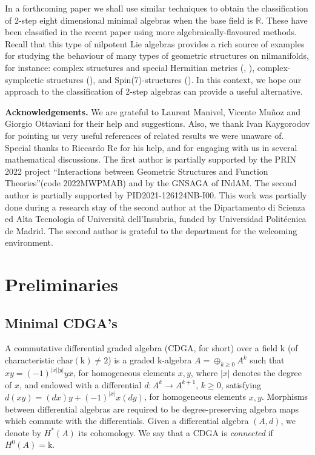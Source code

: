 \documentclass[10pt,reqno]{amsart}
\newcommand{\RR}{\mathbb{R}}
\newcommand{\kk}{\mathrm{k}}
\theoremstyle{definition}
\begin{document}
In a forthcoming paper we shall use similar techniques to obtain the classification of $2$-step eight dimensional minimal algebras when the base field is $\RR$. These have been classified in the recent paper \cite{Borovoi2024} using more algebraically-flavoured methods. Recall that this type of nilpotent Lie algebras provides a rich source of examples for studying the behaviour of many types of geometric structures on nilmanifolds, for instance: complex structures and special Hermitian metrics (\cite{latorre2025}, \cite{latorre2017}), complex-symplectic structures (\cite{bazzoni2018}), and Spin(7)-structures (\cite{bazzoni2022}).
In this context, we hope our approach to the classification of 2-step algebras can provide a useful alternative.




\textbf{Acknowledgements.} We are grateful to Laurent Manivel, Vicente Muñoz and Giorgio Ottaviani for their help and suggestions. Also, we thank Ivan Kaygorodov for pointing us very useful references of related results we were unaware of. Special thanks to Riccardo Re for his help, and for engaging with us in several mathematical discussions. The first author is partially supported by the PRIN 2022 project ``Interactions between Geometric Structures and Function Theories''(code 2022MWPMAB) and by the GNSAGA of INdAM. The second author is partially supported by PID2021-126124NB-I00. This work was partially done during a research stay of the second author at the Dipartamento di Scienza ed Alta Tecnologia of Università dell'Insubria, funded by Universidad Politécnica de Madrid. The second author is grateful to the department for the welcoming environment.


\section{Preliminaries}\label{sec:preliminaries} 

\subsection{Minimal CDGA's}

A commutative differential graded algebra (CDGA, for short) over a field $\kk$ (of characteristic $\textrm{char}(\kk)\neq 2$) is a
graded $\kk$-algebra $A=\oplus_{k\geq 0} A^k$ such that $xy=(-1)^{|x||y|} yx$, for homogeneous
elements $x,y$, where $|x|$ denotes the degree of $x$, and endowed with a differential $d\colon A^k\to A^{k+1}$, $k\geq 0$, satisfying $d(xy)=(dx) y + (-1)^{|x|} x (dy)$, for homogeneous elements $x,y$. Morphisms between differential algebras are required to be degree-preserving algebra maps which commute with the differentials. Given a differential algebra $(A,d)$, we denote by $H^*(A)$ its cohomology. We say that a CDGA is \textit{connected} if $H^0(A)=\kk$.
\end{document}
